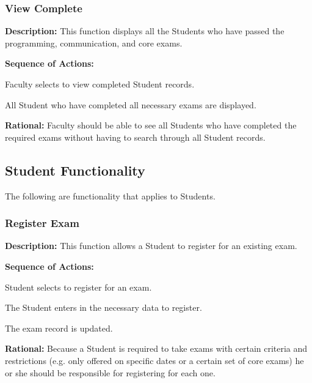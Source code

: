    \subsubsection{\large View Complete}  
   \begin{boxed} %
      \textbf{Description:}
      {\small This function displays all the Students who have passed the
         programming, communication, and core exams. }
         
         \textbf{Sequence of Actions:}
         \begin{enumerate}
               {\small
            \item Faculty selects to view completed Student records.
            \item All Student who have completed all necessary exams are
               displayed.}
      \end{enumerate}

         \textbf{Rational:}
         {\small Faculty should be able to see all Students who have completed the
         required exams without having to search through all Student records.}
   \end{boxed} %


\subsection{Student Functionality}
The following are functionality that applies to Students.

\subsubsection{\large Register Exam} 
\begin{boxed} %
   \textbf{Description:}
   {\small This function allows a Student to register for an existing exam.}
         
         \textbf{Sequence of Actions:}
         \begin{enumerate}
               {\small
            \item Student selects to register for an exam.
            \item The Student enters in the necessary data to register.
            \item The exam record is updated.}
         \end{enumerate}

         \textbf{Rational:}
         {\small Because a Student is required to take exams with certain criteria and
         restrictions (e.g. only offered on specific dates or a certain set of
         core exams) he or she should be responsible for registering for each
      one.}
   \end{boxed} %

